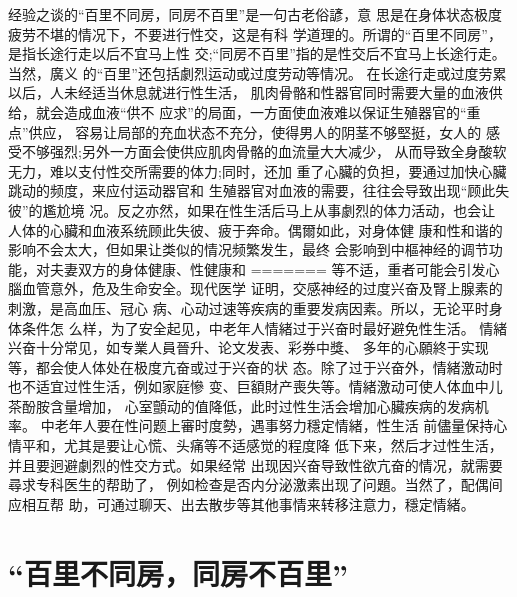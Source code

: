 \documentclass[12pt,UTF8]{ctexbook}
\begin{document}
经验之谈的“百里不同房，同房不百里”是一句古老俗諺，意
思是在身体状态极度疲劳不堪的情况下，不要进行性交，这是有科
学道理的。所谓的“百里不同房”，是指长途行走以后不宜马上性
交;“同房不百里”指的是性交后不宜马上长途行走。当然，廣义
的“百里”还包括劇烈运动或过度劳动等情况。
在长途行走或过度劳累以后，人未经适当休息就进行性生活，
肌肉骨骼和性器官同时需要大量的血液供给，就会造成血液“供不
应求”的局面，一方面使血液难以保证生殖器官的“重点”供应，
容易让局部的充血状态不充分，使得男人的阴茎不够堅挺，女人的
感受不够强烈;另外一方面会使供应肌肉骨骼的血流量大大减少，
从而导致全身酸软无力，难以支付性交所需要的体力;同时，还加
重了心臟的负担，要通过加快心臟跳动的频度，来应付运动器官和
生殖器官对血液的需要，往往会导致出现“顾此失彼”的尷尬境
况。反之亦然，如果在性生活后马上从事劇烈的体力活动，也会让
人体的心臟和血液系统顾此失彼、疲于奔命。偶爾如此，对身体健
康和性和谐的影响不会太大，但如果让类似的情况频繁发生，最终
会影响到中樞神经的调节功能，对夫妻双方的身体健康、性健康和
=======
等不适，重者可能会引发心腦血管意外，危及生命安全。现代医学
证明，交感神经的过度兴奋及腎上腺素的刺激，是高血压、冠心
病、心动过速等疾病的重要发病因素。所以，无论平时身体条件怎
么样，为了安全起见，中老年人情緒过于兴奋时最好避免性生活。
情緒兴奋十分常见，如专業人員晉升、论文发表、彩券中獎、
多年的心願終于实现等，都会使人体处在极度亢奋或过于兴奋的状
态。除了过于兴奋外，情緒激动时也不适宜过性生活，例如家庭慘
变、巨額財产喪失等。情緒激动可使人体血中儿茶酚胺含量增加，
心室顫动的值降低，此时过性生活会增加心臟疾病的发病机率。
中老年人要在性问题上審时度勢，遇事努力穩定情緒，性生活
前儘量保持心情平和，尤其是要让心慌、头痛等不适感觉的程度降
低下来，然后才过性生活，并且要迥避劇烈的性交方式。如果经常
出现因兴奋导致性欲亢奋的情况，就需要尋求专科医生的帮助了，
例如检查是否内分泌激素出现了问題。当然了，配偶间应相互帮
助，可通过聊天、出去散步等其他事情来转移注意力，穩定情緒。

\section{“百里不同房，同房不百里”}
\end{document}

